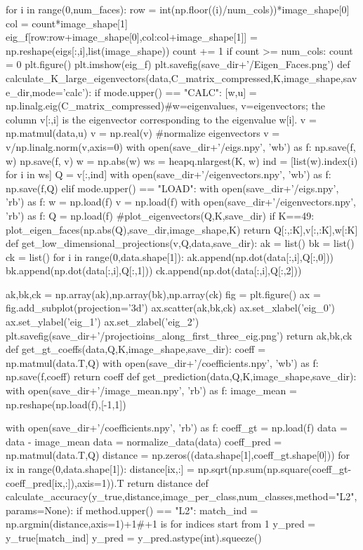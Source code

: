 \documentclass{article}
\begin{document}
\begin{python}
	for i in range(0,num_faces):
		row = int(np.floor((i)/num_cols))*image_shape[0]
		col = count*image_shape[1]
		eig_f[row:row+image_shape[0],col:col+image_shape[1]] = np.reshape(eigs[:,i],list(image_shape))
		count += 1
		if count >= num_cols:
			count = 0
	plt.figure()
	plt.imshow(eig_f)
	plt.savefig(save_dir+'/Eigen_Faces.png')
def calculate_K_large_eigenvectors(data,C_matrix_compressed,K,image_shape,save_dir,mode='calc'):
	if mode.upper() == "CALC":
		[w,u] = np.linalg.eig(C_matrix_compressed)#w=eigenvalues, v=eigenvectors; the column v[:,i] is the eigenvector corresponding to the eigenvalue w[i].
		v = np.matmul(data,u)
		v = np.real(v)
		#normalize eigenvectors
		v = v/np.linalg.norm(v,axis=0)
		with open(save_dir+'/eigs.npy', 'wb') as f:
			np.save(f, w)
			np.save(f, v)
		w = np.abs(w)
		ws = heapq.nlargest(K, w)
		ind = [list(w).index(i) for i in ws]
		Q = v[:,ind]
		with open(save_dir+'/eigenvectors.npy', 'wb') as f:
			np.save(f,Q)
	elif mode.upper() == "LOAD":
		with open(save_dir+'/eigs.npy', 'rb') as f:
			w = np.load(f)
			v = np.load(f)
		with open(save_dir+'/eigenvectors.npy', 'rb') as f:
			Q = np.load(f)
	#plot_eigenvectors(Q,K,save_dir)
	if K==49:
		plot_eigen_faces(np.abs(Q),save_dir,image_shape,K)
	return Q[:,:K],v[:,:K],w[:K]
def get_low_dimensional_projections(v,Q,data,save_dir):
	ak = list()
	bk = list()
	ck = list()
	for i in range(0,data.shape[1]):
		ak.append(np.dot(data[:,i],Q[:,0]))
		bk.append(np.dot(data[:,i],Q[:,1]))
		ck.append(np.dot(data[:,i],Q[:,2]))

	ak,bk,ck = np.array(ak),np.array(bk),np.array(ck)
	fig = plt.figure()
	ax = fig.add_subplot(projection='3d')
	ax.scatter(ak,bk,ck)
	ax.set_xlabel('eig_0')
	ax.set_ylabel('eig_1')
	ax.set_zlabel('eig_2')
	plt.savefig(save_dir+'/projectioins_along_first_three_eig.png')
	return ak,bk,ck
def get_gt_coeffs(data,Q,K,image_shape,save_dir):
	coeff = np.matmul(data.T,Q)
	with open(save_dir+'/coefficients.npy', 'wb') as f:
		np.save(f,coeff)
	return coeff
def get_prediction(data,Q,K,image_shape,save_dir):
	with open(save_dir+'/image_mean.npy', 'rb') as f:
		image_mean = np.reshape(np.load(f),[-1,1])

	with open(save_dir+'/coefficients.npy', 'rb') as f:
		coeff_gt = np.load(f)
	data = data - image_mean
	data = normalize_data(data)
	coeff_pred = np.matmul(data.T,Q)
	distance = np.zeros((data.shape[1],coeff_gt.shape[0]))
	for ix in range(0,data.shape[1]):
		distance[ix,:] = np.sqrt(np.sum(np.square(coeff_gt-coeff_pred[ix,:]),axis=1)).T
	return distance
def calculate_accuracy(y_true,distance,image_per_class,num_classes,method="L2",params=None):
	if method.upper() == "L2":
		match_ind = np.argmin(distance,axis=1)+1#+1 is for indices start from 1
		y_pred = y_true[match_ind]
		y_pred = y_pred.astype(int).squeeze()


\end{python}
\end{document}
